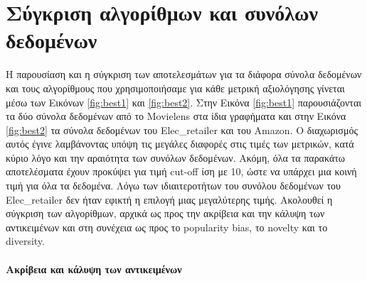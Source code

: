 \section{Σύγκριση αλγορίθμων και συνόλων δεδομένων}
\noindent Η παρουσίαση και η σύγκριση των αποτελεσμάτων για τα διάφορα σύνολα δεδομένων και τους αλγορίθμους που χρησιμοποιήσαμε για κάθε μετρική αξιολόγησης γίνεται μέσω των Εικόνων \ref{fig:best1} και \ref{fig:best2}. Στην Εικόνα \ref{fig:best1} παρουσιάζονται τα δύο σύνολα δεδομένων από το Movielens στα ίδια γραφήματα και στην Εικόνα \ref{fig:best2} τα σύνολα δεδομένων του Elec\_retailer και του Amazon. Ο διαχωρισμός αυτός έγινε λαμβάνοντας υπόψη τις μεγάλες διαφορές στις τιμές των μετρικών, κατά κύριο λόγο και την αραιότητα των συνόλων δεδομένων. Ακόμη, όλα τα παρακάτω αποτελέσματα έχουν προκύψει για τιμή cut-off ίση με 10, ώστε να υπάρχει μια κοινή τιμή για όλα τα δεδομένα. Λόγω των ιδιαιτεροτήτων του συνόλου δεδομένων του Elec\_retailer δεν ήταν εφικτή η επιλογή μιας μεγαλύτερης τιμής. Ακολουθεί η σύγκριση των αλγορίθμων, αρχικά ως προς την ακρίβεια και την κάλυψη των αντικειμένων και στη συνέχεια ως προς το popularity bias, το novelty και το diversity.\\\\
\noindent \textbf{Ακρίβεια και κάλυψη των αντικειμένων}\\
